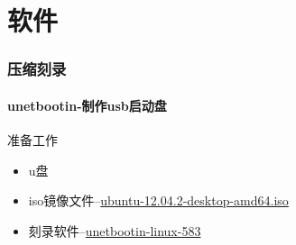 \part{软件}
\setcounter{section}{0}
\section{压缩刻录}
\subsection{unetbootin-制作usb启动盘}
准备工作
\begin{itemize}
\item u盘
\item iso镜像文件--\href{http://releases.ubuntu.com/precise/}{ubuntu-12.04.2-desktop-amd64.iso}
\item 刻录软件--\href{http://www.oschina.net/news/9166/oschina-os-week-recommended-UNetbootin}{unetbootin-linux-583}
\end{itemize} 

